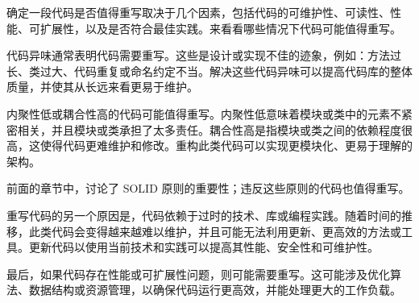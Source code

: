 确定一段代码是否值得重写取决于几个因素，包括代码的可维护性、可读性、性能、可扩展性，以及是否符合最佳实践。来看看哪些情况下代码可能值得重写。

代码异味通常表明代码需要重写。这些是设计或实现不佳的迹象，例如：方法过长、类过大、代码重复或命名约定不当。解决这些代码异味可以提高代码库的整体质量，并使其从长远来看更易于维护。

内聚性低或耦合性高的代码可能值得重写。内聚性低意味着模块或类中的元素不紧密相关，并且模块或类承担了太多责任。耦合性高是指模块或类之间的依赖程度很高，这使得代码更难维护和修改。重构此类代码可以实现更模块化、更易于理解的架构。

前面的章节中，讨论了 SOLID 原则的重要性；违反这些原则的代码也值得重写。

重写代码的另一个原因是，代码依赖于过时的技术、库或编程实践。随着时间的推移，此类代码会变得越来越难以维护，并且可能无法利用更新、更高效的方法或工具。更新代码以使用当前技术和实践可以提高其性能、安全性和可维护性。

最后，如果代码存在性能或可扩展性问题，则可能需要重写。这可能涉及优化算法、数据结构或资源管理，以确保代码运行更高效，并能处理更大的工作负载。
